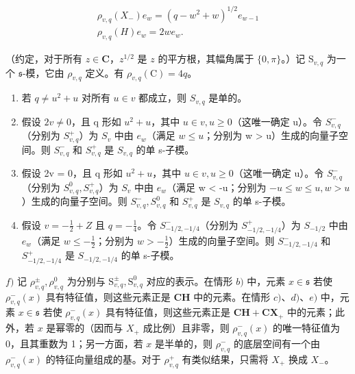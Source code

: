 \[
\begin{array}{c} \rho_ {v, q} (X _ {-}) e _ {w} = (q - w ^ {2} + w) ^ {1 / 2} e _ {w - 1} \\ \rho_ {v, q} (H) e _ {w} = 2 w e _ {w}. \end{array}
\]

（约定，对于所有 \(z \in \mathbf{C}\)，\(z^{1/2}\) 是 \(z\) 的平方根，其幅角属于 \(\{0, \pi\}\)。）记 \(\mathrm{S}_{v,q}\) 为一个 \(\mathfrak{s}\)-模，它由 \(\rho_{v,q}\) 定义。有 \(\rho_{v,q}(\mathrm{C}) = 4q\)。

\begin{enumerate}
\def\labelenumi{\alph{enumi})}
\setcounter{enumi}{1}
\item
  若 \(q \neq u^2 + u\) 对所有 \(u \in v\) 都成立，则 \(S_{v,q}\) 是单的。
\item
  假设 \(2v \neq 0\)，且 q 形如 \(u^{2} + u\)，其中 \(u \in v, u \geq 0\)（这唯一确定 u）。令 \(S_{v,q}^{-}\)（分别为 \(S_{v,q}^{+}\)）为 \(S_{v}\) 中由 \(e_{w}\)（满足 \(w \leq u\)；分别为 w \textgreater{} u）生成的向量子空间。则 \(S_{v,q}^{-}\) 和 \(S_{v,q}^{+}\) 是 \(S_{v,q}\) 的单 s-子模。
\item
  假设 2v = 0，且 q 形如 \(u^{2} + u\)，其中 \(u \in v, u \geq 0\)（这唯一确定 u）。令 \(S_{v,q}^{-}\)（分别为 \(S_{v,q}^{0}, S_{v,q}^{+}\)）为 \(S_{v}\) 中由 \(e_{w}\)（满足 w \textless{} -u；分别为 \(-u \leq w \leq u, w > u\)）生成的向量子空间。则 \(S_{v,q}^{-}, S_{v,q}^{0}\) 和 \(S_{v,q}^{+}\) 是 \(S_{v,q}\) 的单 s-子模。
\item
  假设 \(v = -\frac{1}{2} + Z\) 且 \(q = -\frac{1}{4}\)。令 \(S_{-1/2,-1/4}^{-}\)（分别为 \(S_{-1/2,-1/4}^{+}\)）为 \(S_{-1/2}\) 中由 \(e_{w}\)（满足 \(w \leq -\frac{1}{2}\)；分别为 \(w > -\frac{1}{2}\)）生成的向量子空间。则 \(S_{-1/2,-1/4}^{-}\) 和 \(S_{-1/2,-1/4}^{+}\) 是 \(S_{-1/2,-1/4}\) 的单 s-子模。
\end{enumerate}

\(f)\) 记 \(\rho_{v,q}^{\pm},\rho_{v,q}^{0}\) 为分别与 \(\mathrm{S}_{v,q}^{\pm},\mathrm{S}_{v,q}^{0}\) 对应的表示。在情形 \(b)\) 中，元素 \(x\in \mathfrak{s}\) 若使 \(\rho_{v,q}^{-}(x)\) 具有特征值，则这些元素正是 \(\mathbf{CH}\) 中的元素。在情形 \(c)\)、\(d)\)、\(e)\) 中，元素 \(x\in \mathfrak{s}\) 若使 \(\rho_{v,q}^{-}(x)\) 具有特征值，则这些元素正是 \(\mathbf{CH} + \mathbf{CX}_+\) 中的元素；此外，若 \(x\) 是幂零的（因而与 \(X_{+}\) 成比例）且非零，则 \(\rho_{v,q}^{-}(x)\) 的唯一特征值为 0，且其重数为 1；另一方面，若 \(x\) 是半单的，则 \(\rho_{v,q}^{-}\) 的底层空间有一个由 \(\rho_{v,q}^{-}(x)\) 的特征向量组成的基。对于 \(\rho_{v,q}^{+}\) 有类似结果，只需将 \(X_{+}\) 换成 \(X_{-}\)。

